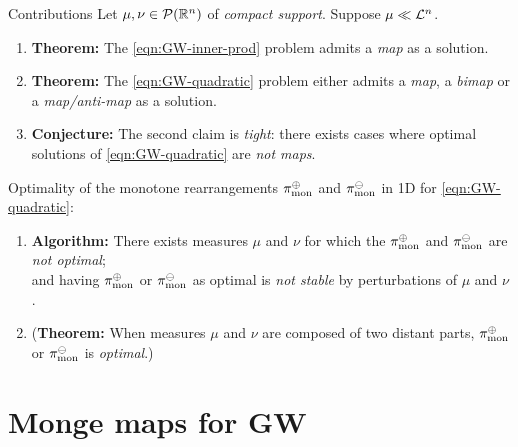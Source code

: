 \documentclass[9pt,xcolor={dvipsnames}]{beamer}
\begin{document}
\begin{frame}{Contributions}
    Let $\mu, \nu\in \mathcal{P}(\mathbb{R}^n)$ of \emph{compact support}. Suppose $\mu\ll\mathcal{L}^n$.
    \begin{enumerate}
        \item \textbf{Theorem:} The \cref{eqn:GW-inner-prod} problem admits a \emph{map} as a solution.
        \item \textbf{Theorem:} The \cref{eqn:GW-quadratic} problem either admits a \emph{map}, a \emph{bimap} or a \emph{map/anti-map} as a solution.
        \item \textbf{Conjecture:} The second claim is \emph{tight}: there exists cases where optimal solutions of \cref{eqn:GW-quadratic} are \emph{not maps}.
    \end{enumerate}
    Optimality of the monotone rearrangements $\pi_\text{mon}^\oplus$ and $\pi_\text{mon}^\ominus$ in 1D for \cref{eqn:GW-quadratic}:
    \vspace{-5mm}
    \begin{enumerate}\addtocounter{enumi}{3}
        \item \textbf{Algorithm:} There exists measures $\mu$ and $\nu$ for which the $\pi_\text{mon}^\oplus$ and $\pi_\text{mon}^\ominus$ are \emph{not optimal};\\
        and having $\pi_\text{mon}^\oplus$ or $\pi_\text{mon}^\ominus$ as optimal is \emph{not stable} by perturbations of $\mu$ and $\nu$.
        \item (\textbf{Theorem:} When measures $\mu$ and $\nu$ are composed of two distant parts, $\pi_\text{mon}^\oplus$ or $\pi_\text{mon}^\ominus$ is \emph{optimal}.)
    \end{enumerate}
\end{frame}


\section{Monge maps for GW}
\end{document}
